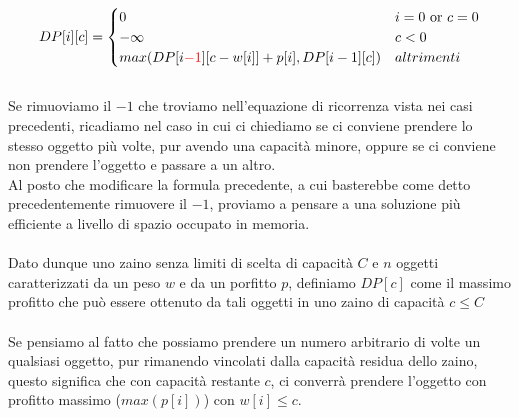 \documentclass[../cheatSheetAlgoritmi.tex]{subfiles}
\begin{document}
\begin{equation*}
  	DP[i][c] =\begin{cases}
    	0 & \text{$i = 0$ or $c = 0$}\\
    	-\infty & \text{$c < 0$}\\
    	max(DP[i \textcolor{red}{-1}][c-w[i]]+p[i], DP[i-1][c]) & \text{$altrimenti$}
  	\end{cases}
\end{equation*} \\
Se rimuoviamo il $-1$ che troviamo nell'equazione di ricorrenza vista nei casi precedenti, ricadiamo nel caso in cui ci chiediamo se ci conviene prendere lo stesso oggetto più volte, pur avendo una capacità minore, oppure se ci conviene non prendere l'oggetto e passare a un altro. \\
Al posto che modificare la formula precedente, a cui basterebbe come detto precedentemente rimuovere il $-1$, proviamo a pensare a una soluzione più efficiente a livello di spazio occupato in memoria. \\\\
Dato dunque uno zaino senza limiti di scelta di capacità $C$ e $n$ oggetti caratterizzati da un peso $w$ e da un porfitto $p$, definiamo $DP[c]$ come il massimo profitto che può essere ottenuto da tali oggetti in uno zaino di capacità $c \leq C$\\\\
Se pensiamo al fatto che possiamo prendere un numero arbitrario di volte un qualsiasi oggetto, pur rimanendo vincolati dalla capacità residua dello zaino, questo significa che con capacità restante $c$, ci converrà prendere l'oggetto con profitto massimo ($max(p[i])$) con $w[i] \leq c$.
\end{document}
